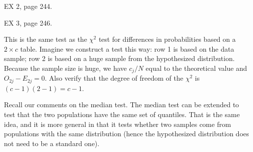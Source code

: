 \documentclass[12pt]{article}
\begin{document}
\example EX 2, page 244.

\example EX 3, page 246.

\alert This is the same test as the $\chi^2$ test for differences in
probabilities based on a $2\times c$ table. Imagine we construct a test
this way: row 1 is based on the data sample; row 2 is based on a
huge sample from the hypothesized distribution.
Because the sample size is huge, we have
$c_j/N$ equal to the theoretical value and $O_{2j} - E_{2j} = 0$.
Also verify that the degree of freedom of the $\chi^2$ is $(c-1)(2-1) =
c-1$.

\alert Recall our comments on the median test.
The median test can be extended to test that the two populations
have the same set of quantiles. That is the same idea,
and it is more general in that it tests whether two samples
come from populations with the same distribution
(hence the hypothesized distribution does not need to be a standard
one).
\end{document}
